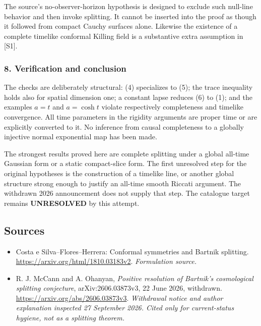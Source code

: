 \documentclass[11pt]{article}
\begin{document}
The source's no-observer-horizon hypothesis is designed to exclude such null-line behavior and then invoke splitting. It cannot be inserted into the proof as though it followed from compact Cauchy surfaces alone. Likewise the existence of a complete timelike conformal Killing field is a substantive extra assumption in [S1].

\subsubsection{8. Verification and conclusion}
The checks are deliberately structural: (4) specializes to (5); the trace inequality holds also for spatial dimension one; a constant lapse reduces (6) to (1); and the examples $a=t$ and $a=\cosh t$ violate respectively completeness and timelike convergence. All time parameters in the rigidity arguments are proper time or are explicitly converted to it. No inference from causal completeness to a globally injective normal exponential map has been made.

The strongest results proved here are complete splitting under a global all-time Gaussian form or a static compact-slice form. The first unresolved step for the original hypotheses is the construction of a timelike line, or another global structure strong enough to justify an all-time smooth Riccati argument. The withdrawn 2026 announcement does not supply that step. The catalogue target remains \textbf{UNRESOLVED} by this attempt.

\subsection{Sources}
\begin{itemize}
\item[S1]Costa e Silva–Flores–Herrera: Conformal symmetries and Bartnik splitting.
\url{https://arxiv.org/html/1810.03183v2}.
\textit{Formulation source.}
\item[E1]R. J. McCann and A. Ohanyan, \emph{Positive resolution of Bartnik's cosmological splitting conjecture}, arXiv:2606.03873v3, 22 June 2026, withdrawn.
\url{https://arxiv.org/abs/2606.03873v3}.
\textit{Withdrawal notice and author explanation inspected 27 September 2026. Cited only for current-status hygiene, not as a splitting theorem.}
\end{itemize}
\end{document}
